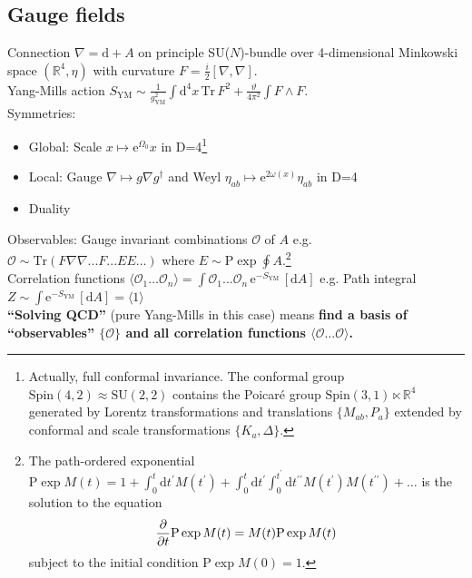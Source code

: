 \documentclass[12pt]{article}
\begin{document}
\subsection{Gauge fields}
Connection $\nabla= \mathrm d+A$ on principle SU($N$)-bundle over 4-dimensional Minkowski space $(\mathbb R^4, \eta)$ with curvature $F=\frac i2[\nabla , \nabla]$.\\
Yang-Mills action $S_\mathrm{YM}\sim \frac 1{g_\mathrm{YM}^2} \int \mathrm d^4 x\, \mathrm {Tr}\,F^2 +\frac \vartheta {4\pi^2} \int F\wedge F $.\\
Symmetries:
\begin{itemize}
\item Global: Scale $x\mapsto \mathrm e^{\Omega_0} x$ in D=4\footnote{Actually, full conformal invariance. The conformal group $\mathrm{Spin}(4,2)\approx \mathrm {SU}(2,2)$ contains the Poicar\'e group $\mathrm{Spin}(3,1)\ltimes \mathbb R^4$ generated by Lorentz transformations and translations $\{ M_{ab}, P_a\}$ extended by conformal and scale transformations $\{K_a, \Delta \}$.}
\item Local: Gauge $\nabla\mapsto g \nabla g^\dagger$ and Weyl $\eta_{ab}\mapsto \mathrm 
e^{2\omega(x)} \eta_{ab}$ in D=4
\item Duality
\end{itemize}
Observables: Gauge invariant combinations $\mathcal O$ of $A$ e.g. $\mathcal O\sim \mathrm{Tr} (F\nabla \nabla ...F...EE...)$ where $E\sim \mathrm P\exp \oint A$.\footnote{The path-ordered exponential $\mathrm P \exp M(t)=1+\int_0^t \mathrm dt^\prime M(t^\prime)+\int_0^t \mathrm dt^\prime\int_0^{t^\prime} \mathrm dt^{\prime\prime} M(t^{\prime}) M(t^{\prime\prime})+\dots$ is the solution to the equation 
\begin{eqnarray}
{\partial \over \partial t} \mathrm P \exp M(t) = M(t) \mathrm P \exp M(t)
\end{eqnarray}
subject to the initial condition $\mathrm P \exp M(0)=1$.
}\\%
Correlation functions $\langle \mathcal O_1 \dots \mathcal O_n\rangle =  \int \mathcal O_1 \dots \mathcal O_n\,  \mathrm e^{-S_\mathrm{YM}}\,[\mathrm d A]$ e.g. Path integral $Z\sim \int  \mathrm e^{-S_\mathrm{YM}}\,[\mathrm d A]=\langle 1\rangle$\\

{\bf ``Solving QCD''} (pure Yang-Mills in this case) means {\bf find a basis of ``observables'' $\{ \mathcal O\}$ and all correlation functions $\langle \mathcal O\dots \mathcal O\rangle$.}\\
\end{document}
